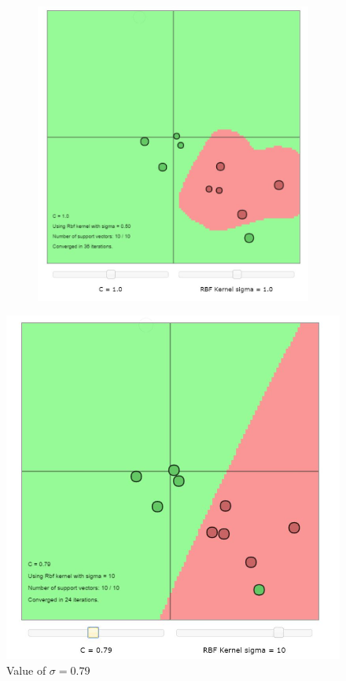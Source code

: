 \documentclass[11pt,oneside,a4paper]{article}
\begin{document}
\begin{figure}[H]
\begin{subfigure}[b]{.5\textwidth}
 	\end{subfigure}%
 	\begin{subfigure}{.5\textwidth}
 		\vspace{-185pt}
 		\centering
 		\includegraphics[width=0.9\linewidth]{../Figures/Default_RBF}
 	\end{subfigure}
 \end{figure}
\begin{figure}[H]
	\centering
 		\includegraphics[scale=0.5]{../Figures/RBF_sigma_10_C_079}
 		\caption{Value of $\sigma = 0.79$}
\end{figure}
\end{document}
